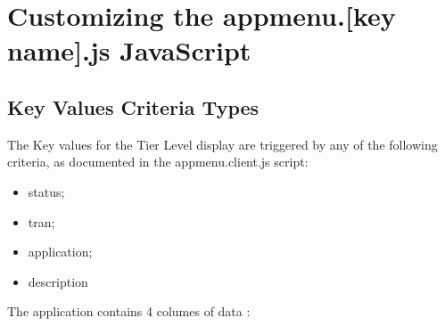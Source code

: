\documentclass[letterpaper,10pt,english]{sphinxmanual}
\begin{document}
\sphinxAtStartPar
{}

\begin{sphinxVerbatim}[commandchars=\\\{\}]
\PYG{p}{[} \PYG{p}{]}             
\PYG{p}{[} \PYG{p}{]}           
\PYG{p}{[} \PYG{p}{]}               
                
\end{sphinxVerbatim}


\section{Customizing the appmenu.{[}key name{]}.js JavaScript}
\label{\detokenize{Customization:customizing-the-appmenu-key-name-js-javascript}}

\subsection{Key Values Criteria Types}
\label{\detokenize{Customization:key-values-criteria-types}}
\sphinxAtStartPar
The Key values for the Tier Level display are triggered by any of the following criteria, as documented in the appmenu.client.js script:
\begin{itemize}
\item {} 
\sphinxAtStartPar
status;

\item {} 
\sphinxAtStartPar
tran;

\item {} 
\sphinxAtStartPar
application;

\item {} 
\sphinxAtStartPar
description

\end{itemize}

\sphinxAtStartPar
The application contains 4 columes of data :\sphinxhyphen{}
\end{document}
